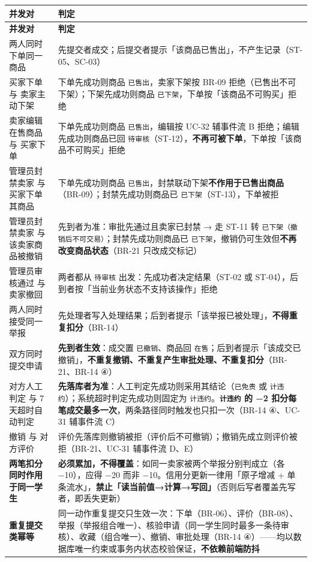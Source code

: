 \documentclass[12pt,a4paper]{ctexart}
\begin{document}
{\scriptsize
\begin{longtable}{|p{2.75cm}|p{13.25cm}|}
\hline
\textbf{并发对} & \textbf{判定} \\
\hline
\endfirsthead
\hline
\textbf{并发对} & \textbf{判定} \\
\hline
\endhead
\hline
\endfoot
两人同时下单同一商品 & 先提交者成交；后提交者提示「该商品已售出」，不产生记录（ST-05、SC-03） \\
\hline
买家下单 与 卖家主动下架 & 下单先成功则商品 \texttt{已售出}，卖家下架按 BR-09 拒绝（已售出不可下架）；下架先成功则商品 \texttt{已下架}，下单按「该商品不可购买」拒绝 \\
\hline
卖家编辑在售商品 与 买家下单 & 下单先成功则商品 \texttt{已售出}，编辑按 UC-32 辅事件流 B 拒绝；编辑先成功则商品已回 \texttt{待审核}（ST-12），\textbf{不再可被下单}，下单按「该商品不可购买」拒绝 \\
\hline
管理员封禁卖家 与 买家下单其商品 & 下单先成功则商品 \texttt{已售出}，封禁联动下架\textbf{不作用于已售出商品}（BR-09）；封禁先成功则商品已 \texttt{已下架}（ST-13），下单被拒 \\
\hline
管理员封禁卖家 与 该卖家商品被撤销 & 先到者为准：审批先通过且卖家已封禁 → 走 ST-11 转 \texttt{已下架（撤销后不可交易）}；封禁先成功则商品已 \texttt{已下架}，撤销仍可生效但\textbf{不再改变商品状态}（BR-21 只改成交标记） \\
\hline
管理员审核通过 与 卖家撤回 & 两者都从 \texttt{待审核} 出发：先成功者决定结果（ST-02 或 ST-04），后到者按「当前业务状态不支持该操作」拒绝 \\
\hline
两人同时接受同一举报 & 先处理者写入处理结果；后到者提示「该举报已被处理」，\textbf{不得重复扣分}（BR-14） \\
\hline
双方同时提交申请 & \textbf{先到者生效}：成交置 \texttt{已撤销}、商品回 \texttt{在售}；后到者提示「该成交已撤销」，\textbf{不重复撤销、不重复产生审批处理、不重复扣分}（BR-21、BR-14 ④） \\
\hline
对方人工判定 与 7 天超时自动判定 & \textbf{先落库者为准}：人工判定先成功则采用其结论（\texttt{已免责} 或 \texttt{计违约}）；系统超时判定先成功则固定为 \texttt{计违约}。\textbf{\texttt{计违约} 的 −2 扣分每笔成交最多一次}，两条路径同时触发也只扣一次（BR-14 ④、UC-31 辅事件流 C） \\
\hline
撤销 与 对方评价 & 评价先落库则撤销被拒（评价后不可撤销）；撤销先成立则评价被拒（BR-21、UC-31 辅事件流 D、E） \\
\hline
\textbf{两笔扣分同时作用于同一学生} & \textbf{必须累加，不得覆盖}：如同一卖家被两个举报分别判成立（各 −10），应得 −20 而非 −10。信用分更新一律用「原子增减 + 单条流水」，\textbf{禁止「读当前值→计算→写回」}（否则后写者覆盖先写者，即丢失更新） \\
\hline
\textbf{重复提交类幂等} & 同一动作重复提交只生效一次：下单（BR-06）、评价（BR-08）、举报（举报组合唯一）、核验申请（同一学生同时最多一条待审核）、收藏（组合唯一）、撤销、审批处理（BR-14 ④）——均以数据库唯一约束或事务内状态校验保证，\textbf{不依赖前端防抖} \\
\hline
\end{longtable}
}
\end{document}
